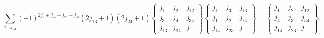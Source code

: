 \[\sum_{j_{13}\,j_{24}}(-1)^{2j_{2}+j_{24}+j_{23}-j_{34}}(2j_{13}+1)(2j_{24}+1)%
\begin{Bmatrix}j_{1}&j_{2}&j_{12}\\
j_{3}&j_{4}&j_{34}\\
j_{13}&j_{24}&j\end{Bmatrix}\begin{Bmatrix}j_{1}&j_{3}&j_{13}\\
j_{4}&j_{2}&j_{24}\\
j_{14}&j_{23}&j\end{Bmatrix}=\begin{Bmatrix}j_{1}&j_{2}&j_{12}\\
j_{4}&j_{3}&j_{34}\\
j_{14}&j_{23}&j\end{Bmatrix}.\]